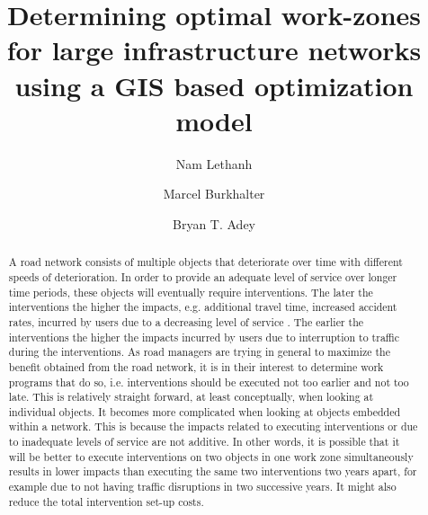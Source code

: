 \documentclass[a4paper,3p,times,authoryear]{elsarticle}
\begin{document}
\begin{frontmatter}


\dochead{}


\title{Determining optimal work-zones for large infrastructure networks using a GIS based optimization model}

\author[nam]{Nam Lethanh }
\author[marcel]{Marcel Burkhalter}
\author[bryan]{Bryan T. Adey}
\address[nam]{Research Associate, PhD. Institute of Construction and Infrastructure Management, Swiss Federal Institute of Technology (ETH), Z\"{u}rich 8093, Switzerland}
\address[marcel]{Master student, Institute for Transport Planning and Systems , Swiss Federal Institute of Technology (ETH), Z\"{u}rich 8093, Switzerland}
\address[bryan]{Professor, PhD. Institute of Construction and Infrastructure Management, Swiss Federal Institute of Technology (ETH), Z\"{u}rich 8093, Switzerland}

\begin{abstract}
A road network consists of multiple objects that deteriorate over time with different speeds of deterioration. In order to provide an adequate level of service over longer time periods, these objects will eventually require interventions. The later the interventions the higher the impacts, e.g. additional travel time, increased accident rates, incurred by users due to a decreasing level of service \citep{Adey2012}. The earlier the interventions the higher the impacts incurred by users due to interruption to traffic during the interventions. As road managers are trying in general to maximize the benefit obtained from the road network, it is in their interest to determine work programs that do so, i.e. interventions should be executed not too earlier and not too late. 
This is relatively straight forward, at least conceptually, when looking at individual objects. It becomes more complicated when looking at objects embedded within a network. This is because the impacts related to executing interventions or due to inadequate levels of service are not additive. In other words, it is possible that it will be better to execute interventions on two objects in one work zone simultaneously results in lower impacts than executing the same two interventions two years apart, for example due to not having traffic disruptions in two successive years. It might also reduce the total intervention set-up costs.


\end{abstract}
\end{frontmatter}
\end{document}
